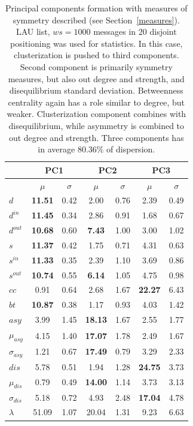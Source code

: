 \documentclass[%
 aip,
 jmp,%
 amsmath,amssymb,
 reprint,%
]{revtex4-1}
\begin{document}
\begin{table}
  \centering
  \caption{Principal components formation with measures of symmetry described (see Section~\ref{measures}). LAU list, $ws=1000$ messages in 20 disjoint positioning was used for statistics. In this case, clusterization is pushed to third components. Second component is primarily symmetry measures, but also out degree and strength, and disequilibrium standard deviation. Betweenness centrality again has a role similar to degree, but weaker. Clusterization component combines with disequilibrium, while asymmetry is combined to out degree and strength. Three components has in average 80.36\% of dispersion.}
  \begin{tabular}{|l|c|c| c|c| c|c|}\hline
 & \multicolumn{2}{c|}{PC1} & \multicolumn{2}{c|}{PC2} & \multicolumn{2}{c|}{PC3}  \\\hline
       & $\mu$ & $\sigma$ & $\mu$ & $\sigma$ & $\mu$ & $\sigma$  \\\hline
$d$            & {\bf 11.51} & 0.42 & 2.00  & 0.76 & 2.39  & 0.49 \\ 
$d^{in}$       & {\bf 11.45} & 0.34 & 2.86  & 0.91 & 1.68  & 0.67 \\
$d^{out}$      & {\bf 10.68} & 0.60 & {\bf 7.43}  & 1.00 & 3.00  & 1.02 \\
$s$            & {\bf 11.37} & 0.42 & 1.75  & 0.71 & 4.31  & 0.63 \\ 
$s^{in}$       & {\bf 11.33} & 0.35 & 2.39  & 1.10 & 3.69  & 0.86 \\ 
$s^{out}$      & {\bf 10.74} & 0.55 & {\bf 6.14}  & 1.05 & 4.75  & 0.98 \\ \hline
$cc$           & 0.91        & 0.64 & 2.68  & 1.67 & {\bf 22.27} & 6.43 \\ 
$bt$           & {\bf 10.87} & 0.38 & 1.17  & 0.93 & 4.03  & 1.42 \\ \hline
$asy$          & 3.99        & 1.45 & {\bf 18.13} & 1.67 & 2.55  & 1.77 \\
$\mu_{asy}$    & 4.15        & 1.40 & {\bf 17.07} & 1.78 & 2.49  & 1.67 \\
$\sigma_{asy}$ & 1.21        & 0.67 & {\bf 17.49} & 0.79 & 3.29  & 2.33 \\
$dis$          & 5.78        & 0.51 & 1.94  & 1.28 & {\bf 24.75} & 3.73 \\
$\mu_{dis}$    & 0.79        & 0.49 & {\bf 14.00} & 1.14 & 3.73  & 3.13 \\
$\sigma_{dis}$ & 5.18        & 0.72 & 4.93  & 2.48 & {\bf 17.04} & 4.78 \\ \hline
$\lambda$      & 51.09       & 1.07 & 20.04 & 1.31 & 9.23  & 6.63 \\ \hline
  \end{tabular}
  \label{compPCA2}
\end{table}
\end{document}
